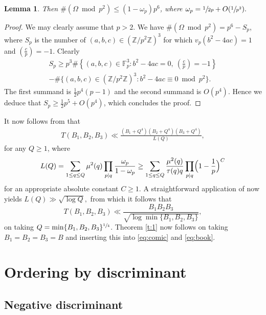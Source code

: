 \documentclass[JEP,XML,SOM,Unicode]{cedram}
\newcommand{\FF}{\mathbb{F}}
\newcommand{\ZZ}{\mathbb{Z}}\let\Z\ZZ
\newtheorem{lemma}[theorem]{Lemma}
\begin{document}
\begin{lemma}
Then $\#(\Omega \bmod{p^2})\leq (1-\omega_p)p^6$, where
$\omega_p=\sfrac{1}{2p}+O(\sfrac{1}{p^2}).$
\end{lemma}

\begin{proof}
We may clearly assume that $p>2$. We have $\#(\Omega \bmod{p^2})=p^6-S_p$, where
$S_p$ is the number of $(a,b,c)\in (\ZZ/p^2\ZZ)^3$ for which $v_p(b^2-4ac)=1$ and
$(\frac{c}{p})= -1$.
Clearly
\begin{multline*}
S_p\geq
p^3\#\left\{ (a,b,c)\in \FF_p^3: b^2-4ac=0, ~\left(\frac{c}{p}\right)= -1\right\}\\
-\#\bigl\{
(a,b,c)\in (\ZZ/p^2\ZZ)^3: b^2-4ac\equiv 0\bmod{p^2}\bigr\}.
\end{multline*}
The first summand is $\frac{1}{2}p^4(p-1)$
and the second summand is $O(p^4)$.
Hence we deduce that
$S_p\geq \frac{1}{2}p^5+O(p^4)$, which concludes the proof.
\end{proof}

It now follows from
\cite[Lem.\,6.3]{large} that
\begin{align*}
T(B_1,B_2,B_3)
\ll \frac{(B_1+Q^4)(B_2+Q^4)(B_3+Q^4)}{L(Q)},
\end{align*}
for any $Q\geq 1$,
where
\[
L(Q)=\sum_{1\leq q\leq Q}\mu^2(q)\prod_{p\mid q} \frac{\omega_p}{1-\omega_p}\geq
\sum_{1\leq q\leq Q}\frac{\mu^2(q)}{\tau(q)q}\prod_{p\mid q} \Bigl(1-\frac{1}{p}\Bigr)^C
\]
for an appropriate absolute constant $C\geq 1$.
A straightforward application of
\hbox{\cite[Th.\,A.5]{FrIwOdC}} now yields
$
L(Q)\gg \sqrt{\log Q},
$
from which it follows that
\begin{equation}\label{eq:Tve}
T(B_1,B_2,B_3)\ll \frac{B_1B_2B_3}{\sqrt{\log \min \{B_1,B_2,B_3\}}},
\end{equation}
on taking $Q=\min \{B_1,B_2,B_3\}^{\sfrac{1}{4}}$.
Theorem \ref{t:1} now follows on
taking $B_1=B_2=B_3=B$ and
inserting this into \eqref{eq:comic} and \eqref{eq:book}.

\section{Ordering by discriminant}

\subsection{Negative discriminant}\label{sec:disc1}
\end{document}

